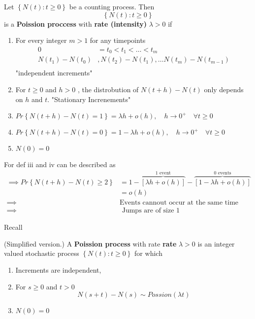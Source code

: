 \documentclass{article}
\theoremstyle{remark}
\begin{document}
\begin{definition}
  Let $\left\{ N\left( t \right) : t \ge 0 \right\}$ be a counting process.  Then \[
  \left\{ N\left( t \right): t \ge 0 \right\}
  \] is  a \textbf{Poission proccess}  with \textbf{rate (intensity)}  $\lambda > 0 $  if

  \begin{enumerate}[label=(\roman*)]
    \item For every integer $m> 1$ for any timepoints \[
        \begin{split}
    0  & = t_{0} < t_{1} < \ldots < t_{m} \\
    N\left( t_{1} \right) - N\left( t_{0} \right)  & , N\left( t_{2} \right) - N\left( t_{1} \right), \ldots N\left( t_{m} \right) - N\left( t_{m-1} \right)  \\
        \end{split}
    \]
    "independent increments"
  \item For $t\ge 0$ and $h > 0$ ,  the distrobution of $N\left( t + h \right) - N\left( t \right)$  only depends on $h$ and $t$.
    "Stationary Increnements"
  \item  $Pr \left \{ N\left( t + h \right) - N\left( t \right) = 1 \right \}  = \lambda  h + o\left( h \right), \quad h \to 0^{+} \quad   \forall t\ge0 $
  \item $Pr \left \{ N\left( t + h \right) - N\left( t \right) = 0 \right \}  = 1 - \lambda h  + o\left( h \right),  \quad h\to 0^{+} \quad  \forall t\ge 0  $
  \item $N\left( 0 \right) = 0$

  \end{enumerate}
  For def iii and iv can be described as \[
  \begin{split}
    \implies  Pr \left \{ N\left( t + h \right) - N\left( t \right) \ge 2  \right \}  &=  1 - \overbrace{\left[ \lambda h + o\left( h \right) \right] }^{ 1 \text{ event}} - \overbrace{\left[ 1 - \lambda h + o\left( h \right) \right]}^{0 \text{ events}}  \\
    &= o\left( h \right) \\
    \implies  & \text{Events cannout occur at the same time} \\
    \implies  &  \text{ Jumps are of size 1}
  \end{split}
  \]
\end{definition}

Recall

\begin{definition}
  (Simplified version.) A \textbf{Poission process}  with rate \textbf{rate}  $\lambda > 0$ is an integer valued  stochastic process $\left\{ N\left( t \right) : t \ge 0 \right\}$ for which
  \begin{enumerate}[label=(\roman*)]
    \item Increments are independent,
    \item For $s \ge 0$ and $t > 0$ \[
    N\left( s+t \right) - N\left( s \right) \sim Possion\left( \lambda t \right)
    \]
  \item $N\left( 0 \right) = 0$
  \end{enumerate}
\end{definition}
\end{document}
